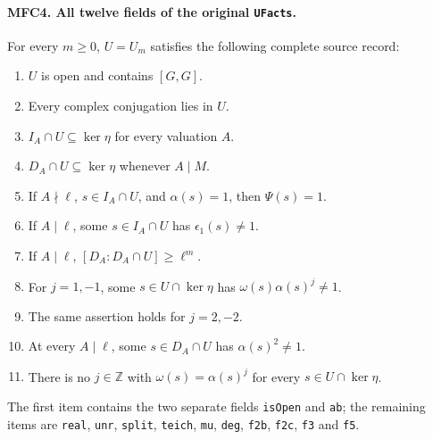 \paragraph{MFC4. All twelve fields of the original \texttt{UFacts}.}
\label{claim:MFC4}
For every \(m\ge0\), \(U=U_m\) satisfies the following
complete source record:
\begin{enumerate}
\item \(U\) is open and contains \([G,G]\).
\item Every complex conjugation lies in \(U\).
\item \(I_A\cap U\subseteq\ker\eta\) for every valuation \(A\).
\item \(D_A\cap U\subseteq\ker\eta\) whenever \(A\mid M\).
\item If \(A\nmid\ell\), \(s\in I_A\cap U\), and
      \(\alpha(s)=1\), then \(\Psi(s)=1\).
\item If \(A\mid\ell\), some \(s\in I_A\cap U\) has
      \(\epsilon_1(s)\ne1\).
\item If \(A\mid\ell\), \([D_A:D_A\cap U]\ge\ell^m\).
\item For \(j=1,-1\), some \(s\in U\cap\ker\eta\) has
      \(\omega(s)\alpha(s)^j\ne1\).
\item The same assertion holds for \(j=2,-2\).
\item At every \(A\mid\ell\), some \(s\in D_A\cap U\)
      has \(\alpha(s)^2\ne1\).
\item There is no \(j\in\mathbb Z\) with
      \(\omega(s)=\alpha(s)^j\) for every
      \(s\in U\cap\ker\eta\).
\end{enumerate}
The first item contains the two separate fields
\texttt{isOpen} and \texttt{ab}; the remaining items are
\texttt{real}, \texttt{unr}, \texttt{split}, \texttt{teich},
\texttt{mu}, \texttt{deg}, \texttt{f2b}, \texttt{f2c},
\texttt{f3} and \texttt{f5}.

